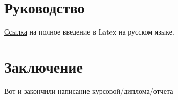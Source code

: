 \section{Руководство}
\href{https://www.texlive.info/CTAN/info/lshort/russian/lshortru.pdf}{Ссылка} на полное введение в Latex на русском языке.


\section{Заключение}
Вот и закончили написание курсовой/диплома/отчета


